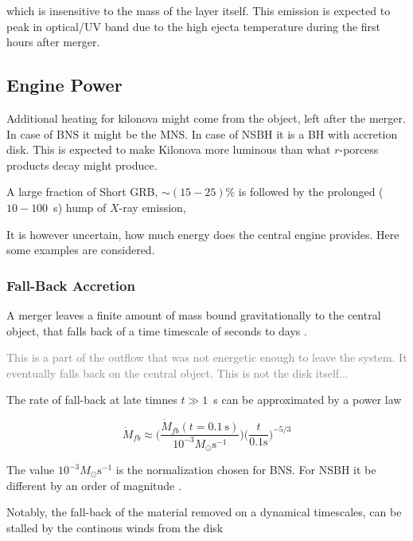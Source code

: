 \documentclass[11pt,a4paper,headinclude=true,DIV=14,BCOR=8mm,chapterprefix,listof=totoc,twoside,openright,abstracton]{scrbook}
\newcommand{\gray}[1]{\textcolor{gray}{#1}}
\begin{document}
which is insensitive to the mass of the layer itself. 
This emission is expected to peak in optical/UV band due to the high ejecta temperature during the first hours after merger. 


\subsection{Engine Power}

Additional heating for kilonova might come from the object, left after the merger. In case of BNS it might be the MNS. In case of NSBH it is a BH with accretion disk. This is expected to make Kilonova more luminous than what $r$-porcess products decay might produce.

A large fraction of Short GRB, $\sim(15-25)\%$ is followed by the prolonged ($10-100$~s) hump of $X$-ray emission, \cite{Norris and Bonnell 2006; Perley et al 2009 Kagawa et al 2015}

It is however uncertain, how much energy does the central engine provides. Here some examples are considered.

\subsubsection{Fall-Back Accretion}

A merger leaves a finite amount of mass bound gravitationally to the central object, that falls back of a time timescale of seconds to days \cite{(Rosswog 2007; Rossi and Begelman 2009; Chawla et al 2010; Kyutoku et al 2015)}.

\gray{This is a part of the outflow that was not energetic enough to leave the system. It eventually falls back on the central object. This is not the disk itself...}

The rate of fall-back at late timnes $t\gg 1$~s can be approximated by a power law 

\begin{equation}
    \dot{M}_{fb} \approx \Bigg( \frac{\dot{M}_{fb}(t=0.1~\text{s})}{10^{-3}M_{\odot}\text{s}^{-1}} \Bigg) \Bigg( \frac{t}{0.1 \text{s}} \Bigg)^{-5/3}
\end{equation}

The value $10^{-3}M_{\odot}\text{s}^{-1}$ is the normalization chosen for BNS. For NSBH it be different by an order of magnitude \cite{(Rosswog 2007)}. 

Notably, the fall-back of the material removed on a dynamical timescales, can be stalled by the continous winds from the disk \cite{(Fernandez et al 2015b)}
\end{document}
